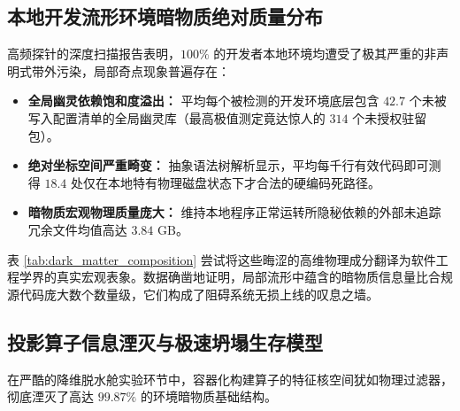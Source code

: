 \documentclass[journal]{IEEEtran}
\begin{document}
\subsection{本地开发流形环境暗物质绝对质量分布}
高频探针的深度扫描报告表明，$100\%$ 的开发者本地环境均遭受了极其严重的非声明式带外污染，局部奇点现象普遍存在：
\begin{itemize}
    \item \textbf{全局幽灵依赖饱和度溢出：} 平均每个被检测的开发环境底层包含 $42.7$ 个未被写入配置清单的全局幽灵库（最高极值测定竟达惊人的 $314$ 个未授权驻留包）。
    \item \textbf{绝对坐标空间严重畸变：} 抽象语法树解析显示，平均每千行有效代码即可测得 $18.4$ 处仅在本地特有物理磁盘状态下才合法的硬编码死路径。
    \item \textbf{暗物质宏观物理质量庞大：} 维持本地程序正常运转所隐秘依赖的外部未追踪冗余文件均值高达 $3.84\text{ GB}$。
\end{itemize}

表 \ref{tab:dark_matter_composition} 尝试将这些晦涩的高维物理成分翻译为软件工程学界的真实宏观表象。数据确凿地证明，局部流形中蕴含的暗物质信息量比合规源代码庞大数个数量级，它们构成了阻碍系统无损上线的叹息之墙。

\begin{table}[htbp]
\caption{本地畸变流形中环境暗物质绝对物理质量成分解构与现实映射}
\label{tab:dark_matter_composition}
\centering
{}
\end{table}

\subsection{投影算子信息湮灭与极速坍塌生存模型}
在严酷的降维脱水舱实验环节中，容器化构建算子的特征核空间犹如物理过滤器，彻底湮灭了高达 $99.87\%$ 的环境暗物质基础结构。
\end{document}
